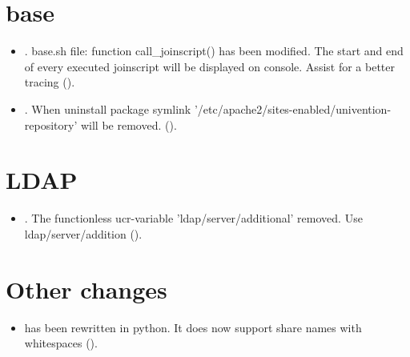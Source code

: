 \section{base}
\begin{itemize}
\item {}. base.sh file: function call\_joinscript() has been modified. The start and end of  every executed joinscript will be displayed on console. Assist for a better tracing ().

\item {}. When uninstall package symlink '/etc/apache2/sites-enabled/univention-repository' will be removed. ().

\end{itemize}

\section{LDAP}
\begin{itemize}
\item {}. The functionless ucr-variable 'ldap/server/additional' removed. Use ldap/server/addition ().

\end{itemize}



\section{Other changes}
\begin{itemize}
\item {} has been rewritten in python. It does
  now support share names with whitespaces ().
\end{itemize}

